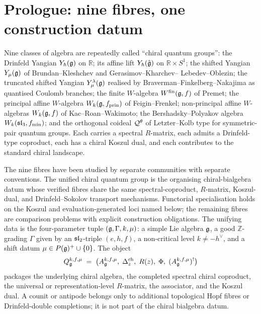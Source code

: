\section*{Prologue: nine fibres, one construction datum}

Nine classes of algebra are repeatedly called ``chiral quantum
groups'': the Drinfeld Yangian $Y_{\hbar}(\mathfrak{g})$ on $\mathbb{R}$; its
affine lift $Y_{\hbar}(\hat{\mathfrak{g}})$ on $\mathbb{R}\times S^1$; the shifted
Yangian $Y_{\mu}(\mathfrak{g})$ of Brundan--Kleshchev and Gerasimov--Kharchev--
Lebedev--Oblezin; the truncated shifted Yangian
$Y^{\lambda}_{\mu}(\mathfrak{g})$ realised by Braverman--Finkelberg--Nakajima as
quantised Coulomb branches; the finite $W$-algebra $W^{\mathrm{fin}}(\mathfrak{g}, f)$ of
Premet; the principal affine $W$-algebra $W_k(\mathfrak{g}, f_{\mathrm{prin}})$
of Feigin--Frenkel; non-principal affine $W$-algebras $W_k(\mathfrak{g}, f)$ of
Kac--Roan--Wakimoto; the Bershadsky--Polyakov algebra
$W_k(\mathfrak{sl}_3, f_{\mathrm{min}})$; and the orthogonal coideal
$\mathcal{Q}^{\theta}$ of Letzter--Kolb type for symmetric-pair quantum
groups. Each carries a spectral $R$-matrix, each admits a Drinfeld-type
coproduct, each has a chiral Koszul dual, and each contributes to the
standard chiral landscape.

The nine fibres have been studied by separate communities with separate
conventions. The unified chiral quantum group is the organising
chiral-bialgebra datum whose verified fibres share the same
spectral-coproduct, $R$-matrix, Koszul-dual, and Drinfeld--Sokolov
transport mechanisms. Functorial specialisation holds on the Koszul
and evaluation-generated loci named below; the remaining fibres are
comparison problems with explicit construction obligations. The
unifying data is the four-parameter tuple $(\mathfrak{g}, \Gamma, k, \mu)$: a
simple Lie algebra $\mathfrak{g}$, a good $\mathbb{Z}$-grading $\Gamma$ given
by an $\mathfrak{sl}_2$-triple $(e,h,f)$, a non-critical level
$k\neq -h^{\vee}$, and a shift datum $\mu \in P(\mathfrak{g})^{+}\cup\{0\}$.
The object
\[
 Q_{\mathfrak{g}}^{k,f,\mu}
 \;=\; \bigl(A_{\mathfrak{g}}^{k,f,\mu},\;\Delta^{\mathrm{ch}}_z,\;R(z),\;\Phi,\;
 (A_{\mathfrak{g}}^{k,f,\mu})^{!}\bigr)
\]
packages the underlying chiral algebra, the completed spectral chiral
coproduct, the universal or representation-level $R$-matrix, the
associator, and the Koszul dual. A counit or antipode belongs only to
additional topological Hopf fibres or Drinfeld-double completions; it
is not part of the chiral bialgebra datum.

